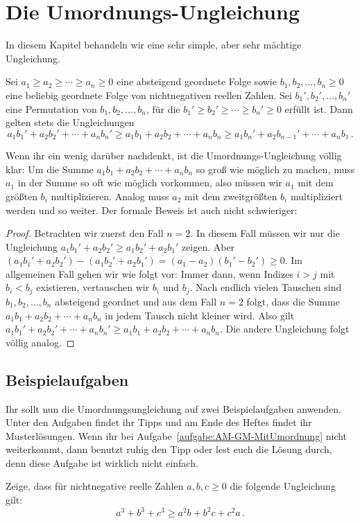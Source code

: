 \section{Die Umordnungs-Ungleichung}\label{kapitel:Umordnung}
In diesem Kapitel behandeln wir eine sehr simple, aber sehr mächtige Ungleichung.
\begin{satzmitnamen}
	Sei $a_1\geqslant a_2\geqslant \dotsb\geqslant a_n\geqslant 0$ eine absteigend geordnete Folge sowie $b_1,b_2,\dotsc,b_n\geqslant 0$ eine beliebig geordnete Folge von nichtnegativen reellen Zahlen. Sei $b_1',b_2',\dotsc,b_n'$ eine Permutation von $b_1,b_2,\dotsc,b_n$, für die $b_1'\geqslant b_2'\geqslant \dotsb\geqslant b_n'\geqslant 0$ erfüllt ist. Dann gelten stets die Ungleichungen
	\begin{equation*}
		a_1b_1'+a_2b_2'+\dotsb+a_nb_n'\geqslant a_1b_1+a_2b_2+\dotsb+a_nb_n\geqslant a_1b_n'+a_2b_{n-1}'+\dotsb+a_nb_1\,.
	\end{equation*}
\end{satzmitnamen}
Wenn ihr ein wenig darüber nachdenkt, ist die Umordnungs-Ungleichung völlig klar: Um die Summe $a_1b_1+a_2b_2+\dotsb+a_nb_n$ so groß wie möglich zu machen, muss $a_1$ in der Summe so oft wie möglich vorkommen, also müssen wir $a_1$ mit dem größten $b_i$ multiplizieren. Analog muss $a_2$ mit dem zweitgrößten $b_i$ multipliziert werden und so weiter. Der formale Beweis ist auch nicht schwieriger:
\begin{proof}
	Betrachten wir zuerst den Fall $n=2$. In diesem Fall müssen wir nur die Ungleichung $a_1b_1'+a_2b_2'\geqslant a_1b_2'+a_2b_1'$ zeigen. Aber $(a_1b_1'+a_2b_2')- (a_1b_2'+a_2b_1')=(a_1-a_2)(b_1'-b_2')\geqslant 0$. Im allgemeinen Fall gehen wir wie folgt vor: Immer dann, wenn Indizes $i>j$ mit $b_i<b_j$ existieren, vertauschen wir $b_i$ und $b_j$. Nach endlich vielen Tauschen sind $b_1,b_2,\dotsc,b_n$ absteigend geordnet und aus dem Fall $n=2$ folgt, dass die Summe $a_1b_1+a_2b_2+\dotsb+a_nb_n$ in jedem Tausch nicht kleiner wird. Also gilt $a_1b_1'+a_2b_2'+\dotsb+a_nb_n'\geqslant a_1b_1+a_2b_2+\dotsb+a_nb_n$. Die andere Ungleichung folgt völlig analog.
\end{proof}

\subsection*{Beispielaufgaben}
Ihr sollt nun die Umordnungsungleichung auf zwei Beispielaufgaben anwenden. Unter den Aufgaben findet ihr Tipps und am Ende des Heftes findet ihr Musterlösungen. Wenn ihr bei Aufgabe~\ref{aufgabe:AM-GM-MitUmordnung} nicht weiterkommt, dann benutzt ruhig den Tipp oder lest euch die Lösung durch, denn diese Aufgabe ist wirklich nicht einfach.
\begin{aufgabe*}\label{aufgabe:EasyUmordnung}
	Zeige, dass für nichtnegative reelle Zahlen $a,b,c\geqslant 0$ die folgende Ungleichung gilt:
	\begin{equation*}
		a^3+b^3+c^3\geqslant a^2b+b^2c+c^2a\,.
	\end{equation*}
\end{aufgabe*}

